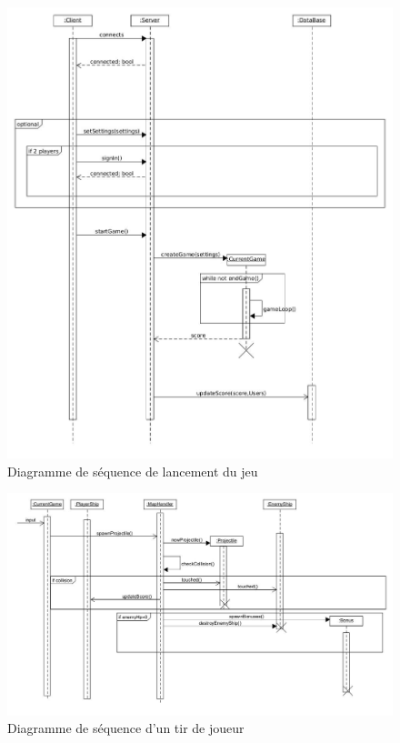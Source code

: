 \documentclass[a4paper,12pt]{article}
\begin{document}
\\
\\\\
\begin{figure}[hbtp]
\centering
\includegraphics[scale=0.3]{images/sequence_diagram_StartGame}
\caption{Diagramme de séquence de lancement du jeu}
\end{figure}

\begin{figure}[hbtp]
\centering
\includegraphics[scale=0.3]{images/player_shooting.jpg}
\caption{Diagramme de séquence d'un tir de joueur}
\end{figure}
\end{document}
